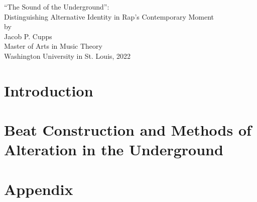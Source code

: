 \documentclass[12pt]{report}
\begin{document}
    \begin{center}
        \large ``The Sound of the Underground'': \\
        \large Distinguishing Alternative Identity in Rap's Contemporary Moment  \\
        \normalsize by \\
        Jacob P. Cupps \\
        Master of Arts in Music Theory \\
        
        Washington University in St. Louis, 2022 \\
    \end{center}
    
    \lipsum[0-1]

\chapter{Introduction}


\chapter{Beat Construction and Methods of Alteration in the Underground}


%

%


\singlespacing
\printbibliography
{}
\nocite{*}

\chapter*{Appendix}

\end{document}
